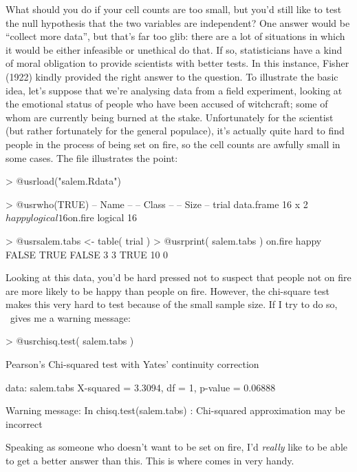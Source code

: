What should you do if your cell counts are too small, but you'd still like to test the null hypothesis that the two variables are independent? One answer would be ``collect more data'', but that's far too glib: there are a lot of situations in which it would be either infeasible or unethical do that. If so, statisticians have a kind of moral obligation to provide scientists with better tests. In this instance, Fisher (1922) kindly provided the right answer to the question. To illustrate the basic idea, let's suppose that we're analysing data from a field experiment, looking at the emotional status of people who have been accused of witchcraft; some of whom are currently being burned at the stake. Unfortunately for the scientist (but rather fortunately for the general populace), it's actually quite hard to find people in the process of being set on fire, so the cell counts are awfully small in some cases. The  file illustrates the point:
\begin{rblock1}
> @usr{load("salem.Rdata")}

> @usr{who(TRUE)}
   -- Name --   -- Class --   -- Size --
   trial        data.frame    16 x 2    
    $happy      logical       16        
    $on.fire    logical       16       

> @usr{salem.tabs <- table( trial )}
> @usr{print( salem.tabs )}
       on.fire
happy   FALSE TRUE
  FALSE     3    3
  TRUE     10    0
\end{rblock1}
Looking at this data, you'd be hard pressed not to suspect that people not on fire are more likely to be happy than people on fire. However, the chi-square test makes this very hard to test because of the small sample size. If I try to do so, \R\ gives me a warning message:
\begin{rblock1}
> @usr{chisq.test( salem.tabs )}

	Pearson's Chi-squared test with Yates' continuity correction

data:  salem.tabs 
X-squared = 3.3094, df = 1, p-value = 0.06888

Warning message:
In chisq.test(salem.tabs) : Chi-squared approximation may be incorrect
\end{rblock1}
Speaking as someone who doesn't want to be set on fire, I'd {\it really} like to be able to get a better answer than this. This is where  \cite{Fisher1922} comes in very handy. 

